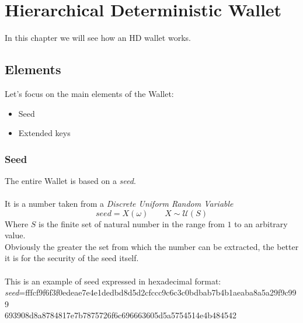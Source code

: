 
\chapter{Hierarchical Deterministic Wallet} %

\label{hd wallet} %




In this chapter we will see how an HD wallet works.

\section{Elements}
Let's focus on the main elements of the Wallet:
\begin{itemize}[label=$\diamond$]
	\item Seed
	\item Extended keys
\end{itemize}

\subsection{Seed}
The entire Wallet is based on a \textit{seed}.
\\ \\
It is a number taken from a \textit{Discrete Uniform Random Variable}
\begin{equation*}
seed=X(\omega) \qquad X\sim \mathcal{U}(S)
\end{equation*}
Where $S$ is the finite set of natural number in the range from $1$ to an arbitrary value.\\ Obviously the greater the set from which the number can be extracted, the better it is for the security of the seed itself.
\\ \\
This is an example of seed expressed in hexadecimal format: \\
\textit{seed}=fffcf9f6f3f0edeae7e4e1dedbd8d5d2cfccc9c6c3c0bdbab7b4b1aeaba8a5a29f9c999 \\ 693908d8a8784817e7b7875726f6c696663605d5a5754514e4b484542 

